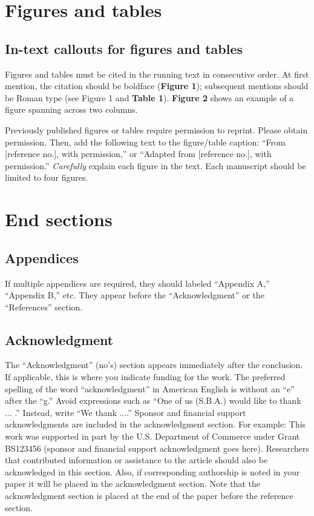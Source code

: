 \documentclass[]{IEEEibm}
\begin{document}
\section{Figures and tables}

\subsection{In-text callouts for figures and tables}

Figures and tables must be cited in the running text in consecutive order. At first mention, the citation should be boldface ({\bf Figure 1}); subsequent mentions should be Roman type (see Figure 1 and {\bf Table 1}). {\bf Figure 2} shows an example of a figure spanning across two columns.
 

Previously published figures or tables require permission to reprint. Please obtain permission. Then, add the following text to the figure/table caption: ``From [reference no.], with permission,'' or ``Adapted from [reference no.], with permission.'' {\it Carefully} explain each figure in the text. Each manuscript should be limited to four figures.\pagebreak

\section{End sections}

\subsection{Appendices}

If multiple appendices are required, they should labeled ``Appendix A,'' ``Appendix B,'' etc. They appear before the ``Acknowledgment'' or the ``References'' section.

\subsection{Acknowledgment}

The ``Acknowledgment'' (no's) section appears immediately after the conclusion. If applicable, this is where you indicate funding for the work. The preferred spelling of the word ``acknowledgment'' in American English is without an ``e'' after the ``g.'' Avoid expressions such as ``One of us (S.B.A.) would like to thank $\ldots$ .'' Instead, write ``We thank $\ldots$.'' Sponsor and financial support acknowledgments are included in the acknowledgment section. For example: This work was supported in part by the U.S. Department of Commerce under Grant BS123456 (sponsor and financial support acknowledgment goes here). Researchers that contributed information or assistance to the article should also be acknowledged in this section. Also, if corresponding authorship is noted in your paper it will be placed in the acknowledgment section. Note that the acknowledgment section is placed at the end of the paper before the reference section.
\end{document}

